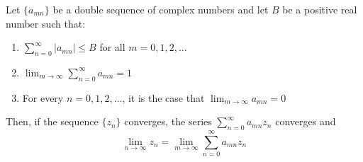 \documentclass[12pt]{article}
\begin{document}
Let $\{a_{mn}\}$ be a double sequence of complex numbers and let $B$ be a positive real number such that:
\begin{enumerate}
\item $\sum_{n=0}^\infty |a_{mn}| \le B$ for all $m = 0, 1, 2, \ldots$
\item $\lim_{m \to \infty} \sum_{n=0}^\infty a_{mn} = 1$
\item For every $n = 0,1,2,\ldots$, it is the case that $\lim_{m \to \infty} a_{mn} = 0$
\end{enumerate}
Then, if the sequence $\{z_n\}$ converges, the series $\sum_{n=0}^ \infty a_{mn} z_n$ converges and
 $$\lim_{n \to \infty} z_n = \lim_{m \to \infty} \sum_{n=0}^ \infty a_{mn} z_n$$
\end{document}
